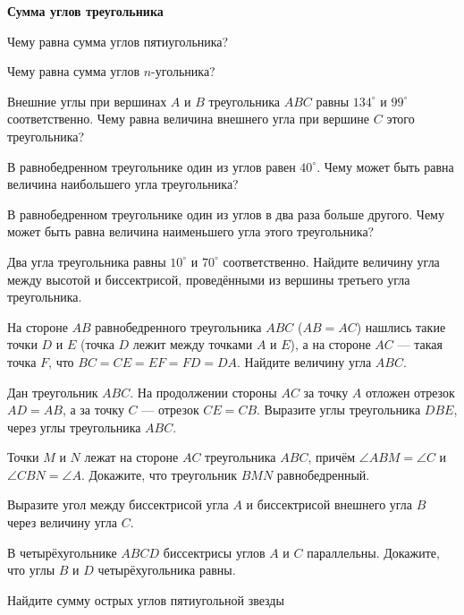 \documentclass{article}
\begin{document}
    \large

    \begin{center}
        \textbf{Сумма углов треугольника}
    \end{center}

    \begin{enumerate_boxed}

        \item Чему равна сумма углов пятиугольника?

        \item Чему равна сумма углов $n$-угольника?

        \item Внешние углы при вершинах $A$ и $B$ треугольника $ABC$ равны $134^\circ$ и $99^\circ$ соответственно.
        Чему равна величина внешнего угла при вершине $C$ этого треугольника?

        \item В равнобедренном треугольнике один из углов равен $40^\circ$.
        Чему может быть равна величина наибольшего угла треугольника?

        \item В равнобедренном треугольнике один из углов в два раза больше другого.
        Чему может быть равна величина наименьшего угла этого треугольника?

        \item Два угла треугольника равны $10^\circ$ и $70^\circ$ соответственно.
        Найдите величину угла между высотой и биссектрисой, проведёнными из вершины третьего угла треугольника.

        \item На стороне $AB$ равнобедренного треугольника $ABC$ ($AB= AC$) нашлись такие точки $D$ и $E$ (точка $D$ лежит между точками $A$ и $E$), а на стороне $AC$ — такая точка $F$, что $BC=CE=EF=FD=DA$.
        Найдите величину угла $ABC$.

        \item Дан треугольник $ABC$.
        На продолжении стороны $AC$ за точку $A$ отложен отрезок $AD=AB$, а за точку $C$ — отрезок $CE = CB$.
        Выразите углы треугольника  $DBE$, через углы треугольника  $ABC$.

        \item Точки $M$ и $N$ лежат на стороне $AC$ треугольника $ABC$, причём $\angle ABM = \angle C$ и $\angle CBN=\angle A$.
        Докажите, что треугольник $BMN$ равнобедренный.

        \item Выразите угол между биссектрисой угла $A$ и биссектрисой внешнего угла $B$ через величину угла $C$.

        \item В четырёхугольнике $ABCD$ биссектрисы углов $A$ и $C$ параллельны.
        Докажите, что углы $B$ и $D$ четырёхугольника равны.

        \item Найдите сумму острых углов пятиугольной звезды

    \end{enumerate_boxed}
\end{document}
